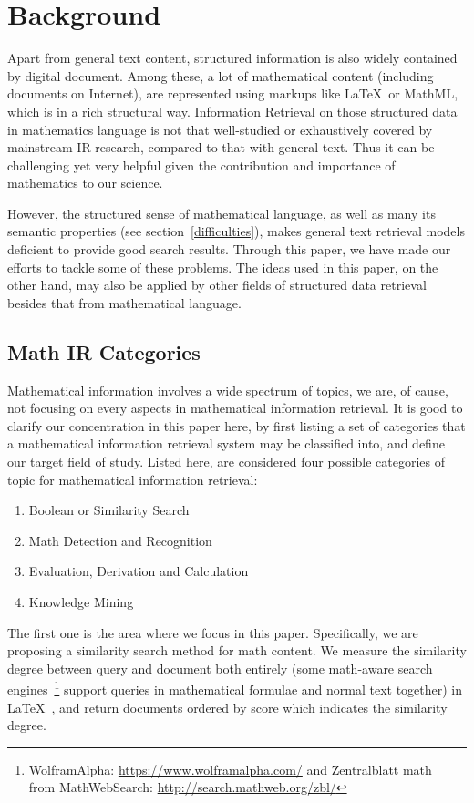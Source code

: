 \chapter{Background}
Apart from general text content, structured information is also widely contained by digital document. Among these, a lot of mathematical content (including documents on Internet), are represented using markups like \LaTeX\  or MathML, which is in a rich structural way. 
Information Retrieval on those structured data in mathematics language is not that well-studied or exhaustively covered by mainstream IR research, compared to that with general text. 
Thus it can be challenging yet very helpful given the contribution and importance of mathematics to our science. 

However, the structured sense of mathematical language, as well as many its semantic properties (see section~\ref{difficulties}), makes general text retrieval models deficient to provide good search results. Through this paper, we have made our efforts to tackle some of these problems. 
The ideas used in this paper, on the other hand, may also be applied by other fields of structured data retrieval besides that from mathematical language. 

\section{Math IR Categories}

Mathematical information involves a wide spectrum of topics, 
we are, of cause, not focusing on every aspects in mathematical information retrieval. 
It is good to clarify our concentration in this paper here, by first listing a set of categories that a mathematical information retrieval system may be classified into,
and define our target field of study.
Listed here, are considered four possible categories of topic for mathematical information retrieval:

\begin{enumerate}
\item Boolean or Similarity Search
\item Math Detection and Recognition
\item Evaluation, Derivation and Calculation
\item Knowledge Mining 
\end{enumerate}

The first one is the area where we focus in this paper. Specifically, we are proposing a similarity search method for math content. We measure the similarity degree between query and document both entirely
(some math-aware search engines~\footnote{WolframAlpha: \url{https://www.wolframalpha.com/} and Zentralblatt math \\from MathWebSearch: \url{http://search.mathweb.org/zbl/}} support queries in mathematical formulae and normal text together) in \LaTeX\ , and return documents ordered by score which indicates the similarity degree. 


